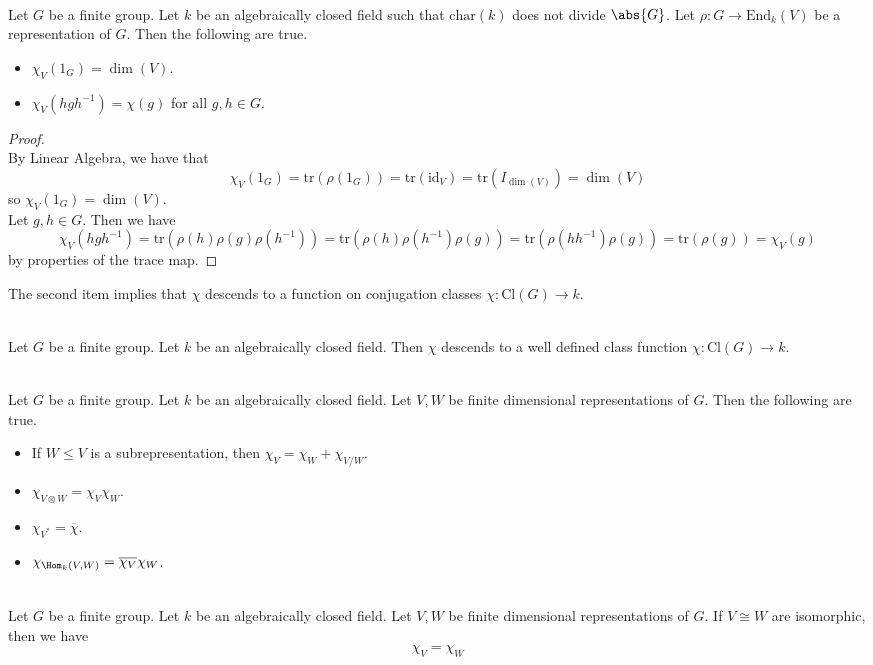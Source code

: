 \documentclass[a4paper]{article}
\begin{document}
\begin{prp}{}{}\\
Let $G$ be a finite group. Let $k$ be an algebraically closed field such that $\text{char}(k)$ does not divide $\abs{G}$. Let $\rho:G\to\text{End}_k(V)$ be a representation of $G$. Then the following are true. 
\begin{itemize}
\item $\chi_V(1_G)=\dim(V)$. 
\item $\chi_V(hgh^{-1})=\chi(g)$ for all $g,h\in G$. 
\end{itemize}
\begin{proof}\\
By Linear Algebra, we have that $$\chi_V(1_G)=\text{tr}(\rho(1_G))=\text{tr}(\text{id}_V)=\text{tr}(I_{\dim(V)})=\dim(V)$$ so $\chi_V(1_G)=\dim(V)$. \\

Let $g,h\in G$. Then we have $$\chi_V(hgh^{-1})=\text{tr}(\rho(h)\rho(g)\rho(h^{-1}))=\text{tr}(\rho(h)\rho(h^{-1})\rho(g))=\text{tr}(\rho(hh^{-1})\rho(g))=\text{tr}(\rho(g))=\chi_V(g)$$ by properties of the trace map. 
\end{proof}
\end{prp}

The second item implies that $\chi$ descends to a function on conjugation classes $\chi:\text{Cl}(G)\to k$. 

\begin{lmm}{}{}\\
Let $G$ be a finite group. Let $k$ be an algebraically closed field. Then $\chi$ descends to a well defined class function $\chi:\text{Cl}(G)\to k$. 
\end{lmm}

\begin{lmm}{}{}\\
Let $G$ be a finite group. Let $k$ be an algebraically closed field. Let $V,W$ be finite dimensional representations of $G$. Then the following are true. 
\begin{itemize}
\item If $W\leq V$ is a subrepresentation, then $\chi_V=\chi_W+\chi_{V/W}$. 
\item $\chi_{V\otimes W}=\chi_V\chi_W$. 
\item $\chi_{V^\ast}=\overline{\chi}$. 
\item $\chi_{\Hom_k(V,W)}=\overline{\chi_V}\chi_W$. 
\end{itemize}
\end{lmm}

\begin{lmm}{}{}\\
Let $G$ be a finite group. Let $k$ be an algebraically closed field. Let $V,W$ be finite dimensional representations of $G$. If $V\cong W$ are isomorphic, then we have $$\chi_V=\chi_W$$
\end{lmm}
\end{document}
